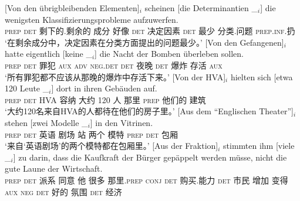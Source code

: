 \begin{sloppypar}
\eal
\ex 
\gll {}[Von den übrigbleibenden Elementen]$_i$ scheinen [die Determinantien \_$_i$] die wenigsten Klassifizierungsprobleme aufzuwerfen.\footnotemark\\
     \spacebr{}\textsc{prep} \textsc{det} 剩下的.剩余的 成分 好像 \spacebr{}\textsc{det} 决定因素 {} \textsc{det} 最少 分类.问题 \textsc{prep}.\textsc{inf}.扔\\
\glt `在剩余成分中，决定因素在分类方面提出的问题最少。'
\ex\label{bsp-von-den-gefangenen} 
\gll {}[Von den Gefangenen]$_i$ hatte eigentlich [keine \_$_i$] die Nacht der Bomben überleben sollen.\footnotemark\\
	 {}\spacebr{}\textsc{prep} \textsc{det} 罪犯 \textsc{aux} \textsc{adv} \spacebr{}\textsc{neg}.\textsc{det} {} \textsc{det} 夜晚 \textsc{det} 爆炸 存活 \textsc{aux}\\
\glt `所有罪犯都不应该从那晚的爆炸中存活下来。'
\ex 
\gll {}[Von der HVA]$_i$ hielten sich [etwa 120 Leute \_$_i$] dort in ihren Gebäuden auf.\footnotemark\\
	 {}\spacebr{}\textsc{prep} \textsc{det} HVA 容纳  \spacebr{}大约 120 人 {} 那里 \textsc{prep} 他们的 建筑 \prt{}\\
\glt `大约120名来自HVA的人都待在他们的房子里。'
\ex 
\gll {}[Aus dem "`Englischen Theater"']$_i$ stehen [zwei Modelle \_$_i$] in den Vitrinen.\footnotemark\hspace{-3pt}\\
	 {}\spacebr{}\textsc{prep} \textsc{det} 英语 剧场 站 \spacebr{}两个 模特 {} \textsc{prep} \textsc{det} 包厢\\
\glt `来自`英语剧场'的两个模特都在包厢里。'
\ex 
\gll {}[Aus der Fraktion]$_i$ stimmten ihm [viele \_$_i$] zu darin, dass die Kaufkraft der Bürger gepäppelt werden müsse, nicht die gute Laune der Wirtschaft.\footnotemark\\
	 {}\spacebr{}\textsc{prep} \textsc{det} 派系 同意 他 \spacebr{}很多 {} \prt{} 那里.\textsc{prep} \textsc{conj} \textsc{det} 购买.能力 \textsc{det} 市民 增加 变得 \textsc{aux} \textsc{neg} \textsc{det} 好的 氛围 \textsc{det} 经济\\

\end{sloppypar}

